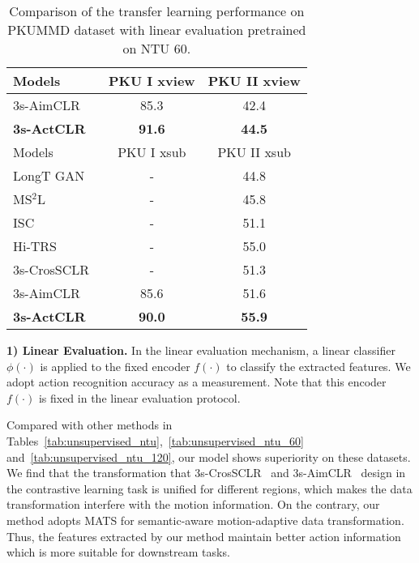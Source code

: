 \documentclass[twocolumn]{article}
\begin{document}
\begin{table}[tb]
    \small
    \centering
    \caption{Comparison of the transfer learning performance on PKUMMD dataset with linear evaluation pretrained on NTU 60.}
    \begin{tabular}{l|c|c}
        \toprule
    Models&PKU I xview& PKU II xview\\
      \midrule
      3s-AimCLR~\cite{guo2021contrastive} & 85.3 & 42.4 \\
      \textbf{3s-ActCLR} & \textbf{91.6} &\textbf{44.5}\\
      \midrule
      \midrule
     Models& PKU I xsub& PKU II xsub\\
      \midrule
      LongT GAN~\cite{zheng2018unsupervised} & - & 44.8 \\
      MS$^2$L~\cite{lin2020ms2l} & - & 45.8\\
      ISC~\cite{thoker2021skeleton} & - & 51.1\\
      Hi-TRS~\cite{chen2022hierarchically} & - & 55.0\\
      3s-CrosSCLR~\cite{li20213d} & - & 51.3\\
      3s-AimCLR~\cite{guo2021contrastive} & 85.6 & 51.6 \\
      \textbf{3s-ActCLR} & \textbf{90.0} &\textbf{55.9}\\
      \bottomrule
  \end{tabular}
    \label{tab:trans_pku}
  \end{table}

\noindent\textbf{1) Linear Evaluation.}
In the linear evaluation mechanism, a linear classifier $\phi(\cdot)$ is applied to the fixed encoder $f(\cdot)$ to classify the extracted features. We adopt action recognition accuracy as a measurement. Note that this encoder $f(\cdot)$ is fixed in the linear evaluation protocol.

Compared with other methods in Tables~\ref{tab:unsupervised_ntu},~\ref{tab:unsupervised_ntu_60} and~\ref{tab:unsupervised_ntu_120}, our model shows superiority on these datasets. We find that the transformation that 3s-CrosSCLR~\cite{li20213d} and 3s-AimCLR~\cite{guo2021contrastive} design in the contrastive learning task is unified for different regions, which makes the data transformation interfere with the motion information. On the contrary, our method adopts MATS for semantic-aware motion-adaptive data transformation. Thus, the features extracted by our method maintain better action information which is more suitable for downstream tasks. 
\end{document}
